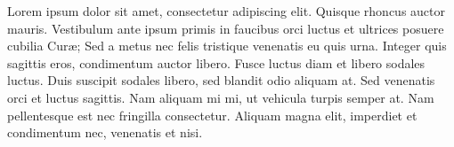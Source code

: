 \noindent
Lorem ipsum dolor sit amet, consectetur adipiscing elit. Quisque rhoncus auctor mauris. Vestibulum ante ipsum primis in faucibus orci luctus et ultrices posuere cubilia Cur\ae{}; Sed a metus nec felis tristique venenatis eu quis urna. Integer quis sagittis eros, condimentum auctor libero. Fusce luctus diam et libero sodales luctus. Duis suscipit sodales libero, sed blandit odio aliquam at. Sed venenatis orci et luctus sagittis. Nam aliquam mi mi, ut vehicula turpis semper at. Nam pellentesque est nec fringilla consectetur. Aliquam magna elit, imperdiet et condimentum nec, venenatis et nisi. 
